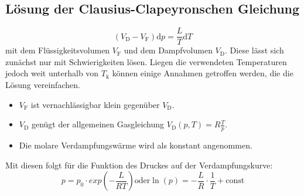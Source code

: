          \subsection{Lösung der Clausius-Clapeyronschen Gleichung}
         \begin{equation}
           (V_\text{D}-V_\text{F})\text{d}p = \frac{L}{T}\text{d}T \label{eq:DGL}
           \end{equation}
           mit dem Flüssigkeitsvolumen $V_\text{F}$ und dem Dampfvolumen $V_\text{D}$.
Diese lässt sich zunächst nur mit Schwierigkeiten lösen.
Liegen die verwendeten Temperaturen jedoch weit unterhalb von $T_\text{k}$ können
 einige Annahmen getroffen werden, die die Lösung vereinfachen.
\begin{itemize}
  \item $V_\text{F}$ ist vernachlässigbar klein gegenüber $V_\text{D}$.
  \item $V_\text{D}$ genügt der allgemeinen Gasgleichung $V_\text{D}(p,T) = R\frac{T}{p}$.
  \item Die molare Verdampfungswärme wird als konstant angenommen.
\end{itemize}
Mit diesen folgt für die Funktion des Druckes auf der Verdampfungskurve:
\begin{equation}
  p = p_0 \cdot exp \left(-\frac{L}{RT}\right) \label{eq:DGLLs} \text{oder} \ln(p) = -\frac{L}{R} \cdot \frac{1}{T}+ \text{const} 
\end{equation}
